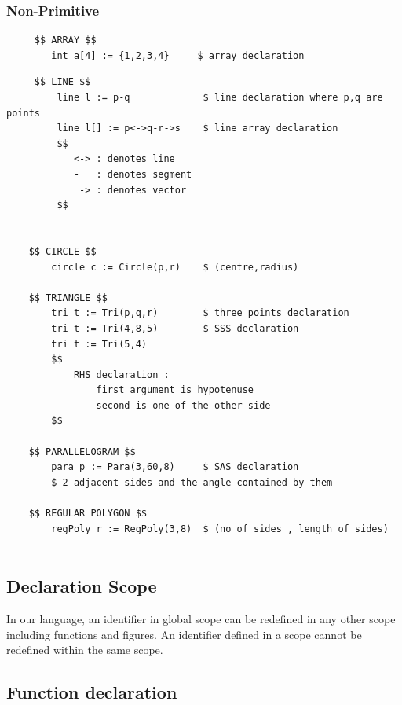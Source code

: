 \documentclass[12pt]{article}
\begin{document}
\subsubsection{Non-Primitive}
\begin{verbatim}
     $$ ARRAY $$
        int a[4] := {1,2,3,4}     $ array declaration 
\end{verbatim}
\pagebreak
\begin{verbatim}
     $$ LINE $$
         line l := p-q             $ line declaration where p,q are points 
         line l[] := p<->q-r->s    $ line array declaration 
         $$
            <-> : denotes line
            -   : denotes segment
             -> : denotes vector
         $$


    $$ CIRCLE $$
        circle c := Circle(p,r)    $ (centre,radius)

    $$ TRIANGLE $$
        tri t := Tri(p,q,r)        $ three points declaration
        tri t := Tri(4,8,5)        $ SSS declaration
        tri t := Tri(5,4)          
        $$ 
            RHS declaration :
                first argument is hypotenuse 
                second is one of the other side
        $$
    
    $$ PARALLELOGRAM $$
        para p := Para(3,60,8)     $ SAS declaration
        $ 2 adjacent sides and the angle contained by them

    $$ REGULAR POLYGON $$
        regPoly r := RegPoly(3,8)  $ (no of sides , length of sides)
   
\end{verbatim}

\subsection{Declaration Scope}
In our language, an identifier in global scope can be redefined in any other scope including functions and figures. An identifier defined in a scope cannot be redefined within the same scope.


\subsection{Function declaration}
\end{document}
